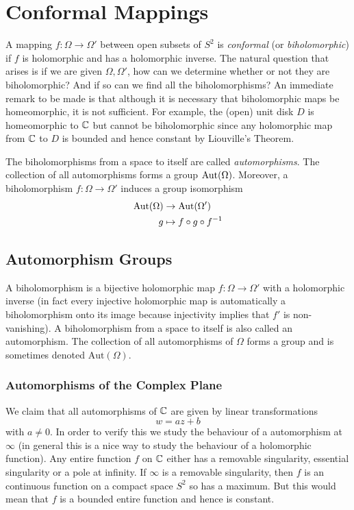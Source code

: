 \section{Conformal Mappings}
A mapping $f: \Omega \to \Omega'$ between open subsets of $S^2$ is \textit{conformal} (or \textit{biholomorphic}) if $f$ is holomorphic and has a holomorphic inverse. The natural question that arises is if we are given $\Omega, \Omega'$, how can we determine whether or not they are biholomorphic? And if so can we find all the biholomorphisms? An immediate remark to be made is that although it is necessary that biholomorphic maps be homeomorphic, it is not sufficient. For example, the (open) unit disk $D$ is homeomorphic to $\mathbb{C}$ but cannot be biholomorphic since any holomorphic map from $\mathbb{C}$ to $D$ is bounded and hence constant by Liouville's Theorem.

The biholomorphisms from a space to itself are called \textit{automorphisms}. The collection of all automorphisms forms a group $\text{Aut}(\Omega)$. Moreover, a biholomorphism $f: \Omega \to \Omega'$ induces a group isomorphism
\begin{align*}
    \text{Aut}(\Omega) &\to \text{Aut}(\Omega')\\
    g &\mapsto f \circ g \circ f^{-1}
\end{align*}

\subsection{Automorphism Groups}
A biholomorphism is a bijective holomorphic map $f: \Omega \to \Omega'$ with a holomorphic inverse (in fact every injective holomorphic map is automatically a biholomorphism onto its image because injectivity implies that $f'$ is non-vanishing). A biholomorphism from a space to itself is also called an automorphism. The collection of all automorphisms of $\Omega$ forms a group and is sometimes denoted $\text{Aut}(\Omega)$. 

\subsubsection{Automorphisms of the Complex Plane}
We claim that all automorphisms of $\mathbb{C}$ are given by linear transformations 
$$w = az + b$$ 
with $a \neq 0$. In order to verify this we study the behaviour of a automorphism at $\infty$ (in general this is a nice way to study the behaviour of a holomorphic function). Any entire function $f$ on $\mathbb{C}$ either has a removable singularity, essential singularity or a pole at infinity. If $\infty$ is a removable singularity, then $f$ is an continuous function on a compact space $S^2$ so has a maximum. But this would mean that $f$ is a bounded entire function and hence is constant. 

